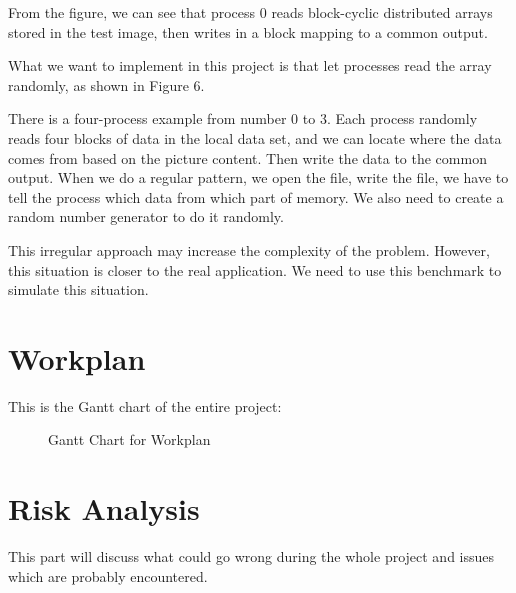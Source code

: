 \documentclass{article}
\begin{document}
From the figure, we can see that process 0 reads block-cyclic distributed arrays stored in the test image, then writes in a block mapping to a common output.

What we want to implement in this project is that let processes read the array randomly, as shown in Figure 6.

There is a four-process example from number 0 to 3. Each process randomly reads four blocks of data in the local data set, and we can locate where the data comes from based on the picture content. Then write the data to the common output.
When we do a regular pattern, we open the file, write the file, we have to tell the process which data from which part of memory.
We also need to create a random number generator to do it randomly.

This irregular approach may increase the complexity of the problem. However, this situation is closer to the real application. We need to use this benchmark to simulate this situation.

\pagebreak

\section{Workplan}
This is the Gantt chart of the entire project:

\begin{figure}[h]
\begin{center}
\end{center}
\caption{Gantt Chart for Workplan}
\label{fig:eucrest}
\end{figure}

\section{Risk Analysis}
This part will discuss what could go wrong during the whole project and issues which are probably encountered.
\end{document}
